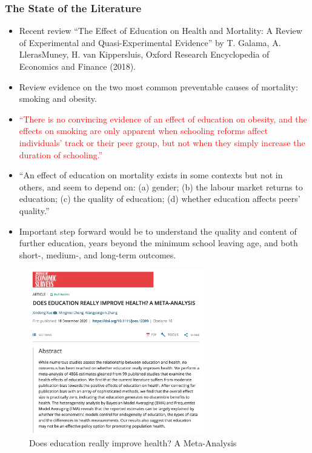             

\subsubsection{The State of the Literature}  
\begin{itemize}
    \item Recent review “The Effect of Education on Health and Mortality: A Review of Experimental and Quasi-Experimental Evidence” by T. Galama, A. LlerasMuney, H. van Kippersluis, Oxford Research Encyclopedia of Economics and Finance (2018).
    \item Review evidence on the two most common preventable causes of mortality: smoking and obesity.
    \item \textcolor{red}{“There is no convincing evidence of an effect of education on obesity, and the effects on smoking are only apparent when schooling reforms affect individuals’ track or their peer group, but not when they simply increase the duration of schooling.”}
    \item “An effect of education on mortality exists in some contexts but not in others, and seem to depend on: (a) gender; (b) the labour market returns to education; (c) the quality of education; (d) whether education affects peers’ quality.”
    \item Important step forward would be to understand the quality and content of further education, years beyond the minimum school leaving age, and both short-, medium-, and long-term outcomes.
\end{itemize}

\begin{figure}[H]%
                \centering
                \includegraphics[width=3in]{images/ch3/49.png}
                \caption {Does education really improve health? A Meta-Analysis}
            \end{figure}

